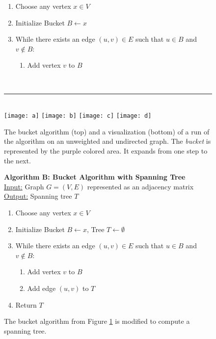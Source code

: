 \documentclass[a4paper]{exam}
\begin{document}
\begin{questions}
\begin{figure}
\begin{center}
\begin{minipage}{.8\textwidth}
    \begin{enumerate}
    \item Choose any vertex $x \in V$
    \item Initialize Bucket $B \leftarrow x$
    \item While there exists an edge $(u, v) \in E$ such that $u \in B$ and $v \not\in B$:
      \begin{enumerate}
      \item Add vertex $v$ to $B$
      \end{enumerate}
    \end{enumerate}
  \end{minipage}\\[5pt]

    \rule{300pt}{.5pt}\\
    \texttt{[image: a]}
    \texttt{[image: b]}
    \texttt{[image: c]}
    \texttt{[image: d]}      
  \end{center}
  \caption{The bucket algorithm (top) and a visualization (bottom) of a run of the algorithm on an unweighted and undirected graph. The \textit{bucket} is represented by the purple colored area. It expands from one step to the next.}
    \label{fig:bucket}
  \end{figure}
  \begin{figure}
    \begin{center}
    \begin{minipage}{.8\textwidth}
\textbf{Algorithm B: Bucket Algorithm with Spanning Tree}\\
\underline{Input:} Graph $G = (V, E)$ represented as an adjacency matrix\\
\underline{Output:} Spanning tree $T$

\begin{enumerate}
    \item Choose any vertex $x \in V$
    \item Initialize Bucket $B \leftarrow x$, Tree $T \leftarrow \emptyset$
    \item While there exists an edge $(u, v) \in E$ such that $u \in B$ and $v \not\in B$:
    \begin{enumerate}
        \item Add vertex $v$ to $B$
        \item Add edge $(u, v)$ to $T$
    \end{enumerate}
    \item Return $T$
\end{enumerate}      
    \end{minipage}
  \end{center}
  \caption{The bucket algorithm from Figure \ref{fig:bucket} is modified to compute a spanning tree.}
    \label{fig:bucketspan}
  \end{figure}


\end{questions}
\end{document}

